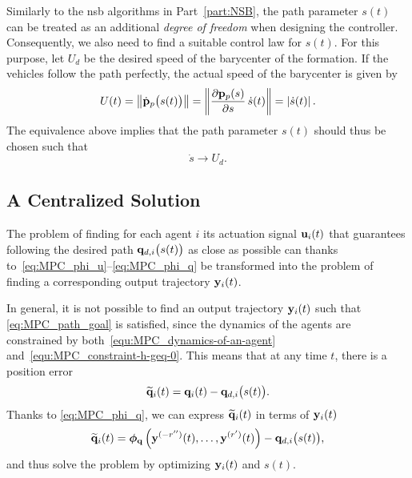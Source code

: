 Similarly to the \gls{nsb} algorithms in Part~\ref{part:NSB}, the path parameter $s(t)$ can be treated as an additional \emph{degree of freedom} when designing the controller. Consequently, we also need to find a suitable control law for $s(t)$. For this purpose, let $U_d$ be the desired speed of the barycenter of the formation. %
If the vehicles follow the path perfectly, the actual speed of the barycenter is given by
\begin{equation}
    U(t)
    =
    \left\|\dot{\mathbf{p}}_p \big( s(t) \big)\right\|
    =
    \left\|\frac{\partial \mathbf{p}_p(s)}{\partial s}\,\dot{s}(t) \right\| = \left|\dot{s}(t)\right|.
\end{equation}
The equivalence above implies that the path parameter $s(t)$ should thus be chosen such that
\begin{equation}
    \dot{s} \rightarrow U_d.
    \label{eq:MPC_param_goal}
\end{equation}



\subsection{A Centralized Solution}
\label{ssec:MPC_centralized}



The problem of finding for each agent $i$ its actuation signal $\mathbf{u}_i(t)$ that guarantees following the desired path $\mathbf{q}_{d,i} \big( s(t) \big)$ as close as possible can thanks to~\eqref{eq:MPC_phi_u}--\eqref{eq:MPC_phi_q} be transformed into the problem of finding a corresponding output trajectory $\mathbf{y}_i(t)$.

In general, it is not possible to find an output trajectory $\mathbf{y}_i(t)$ such that \eqref{eq:MPC_path_goal} is satisfied, since the dynamics of the agents are constrained by both~\eqref{equ:MPC_dynamics-of-an-agent} and~\eqref{equ:MPC_constraint-h-geq-0}. This means that at any time $t$, there is a position error
%
\begin{equation}
    \widetilde{\mathbf{q}}_i(t)
    =
    \mathbf{q}_i(t)
    -
    \mathbf{q}_{d,i} \big( s(t) \big) .
    \label{eq:MPC_q_tilde}
\end{equation}
%
Thanks to \eqref{eq:MPC_phi_q}, we can express $\widetilde{\mathbf{q}}_i(t)$ in terms of $\mathbf{y}_i(t)$
\begin{equation}
    \widetilde{\mathbf{q}}_i(t)
    =
    \bm{\phi}_{\mathbf{q}}\left(\mathbf{y}^{(-r'')}(t), \ldots, \mathbf{y}^{(r')}(t)\right)
    -
    \mathbf{q}_{d,i} \big( s(t) \big), \label{eq:MPC_y_tilde}
\end{equation}
and thus solve the problem by optimizing $\mathbf{y}_i(t)$ and $s(t)$.


